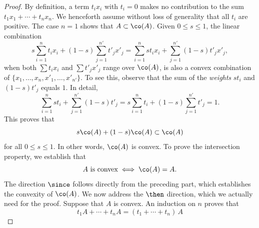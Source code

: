 \begin{proof}\noindent %
By definition, a term $t_i x_i$ with $t_i = 0$ makes no contribution to the sum $t_1 x_1 +\cdots +t_n x_n$. We henceforth %
assume without loss of generality that all $t_i$ are positive. The case $n = 1$ shows that $A \subset \co(A)$. Given %
$0 \leq s \leq 1$, the linear combination
% 
\begin{equation}
  s \sum_{i=1}^{n} t_i x_i + (1-s) \sum_{j=1}^{n'} t'_j x'_j = \sum_{i=1}^{n}  s t_i x_i + \sum_{j=1}^{n'} (1-s) t'_j x'_j, 
\end{equation}
% 
when both $\sum t_i x_i$ and $\sum t'_j x'_j$ range over $\co(A)$, is also a convex combination of %
$\{x_1, \dots, x_n, x'_1, \dots, x'_{n'}\}$. To see this, observe that the sum of the \emph{weights} $st_i$ and $(1-s)t'_j$ %
equals $1$. In detail, 
% 
\begin{equation}
  \sum_{i=1}^{n} st_i + \sum_{j=1}^{n'} (1-s)t'_j = s \sum_{i=1}^{n} t_i +(1-s) \sum_{j=1}^{n'} t'_j  = 1.
\end{equation}
% 
This proves that 
% 
\begin{equation}
  s\co(A) + (1-s)\co(A) \subset \co(A)
\end{equation}
% 
for all $0 \leq s \leq 1$. In other words, $\co(A)$ is convex. 
\skipline
% 
To prove the intersection property, we establish that %
% 
\begin{equation}\label{1.2:convex-iff-co-A-equals-A}
  \text{$A$ is convex} \iff \co(A) = A.
\end{equation}
% 
The direction $\since$ follows directly from the preceding part, which establishes the convexity of $\co(A)$. We now address %
the $\then$ direction, which we actually need for the proof. Suppose that $A$ is convex. An induction on $n$ proves that %
% 
\begin{equation}\label{1.2:sum-of-all-ti-A}
  t_1 A + \cdots + t_n A = (t_1 + \cdots + t_n)\, A
\end{equation}

\end{proof}
